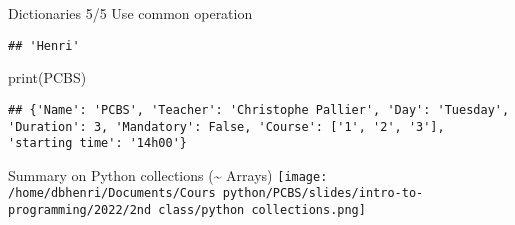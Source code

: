\documentclass[
  8pt,
  ignorenonframetext,
]{beamer}
\newenvironment{Shaded}{\begin{snugshade}}{\end{snugshade}}
\newcommand{\BuiltInTok}[1]{#1}
\newcommand{\NormalTok}[1]{#1}
\begin{document}
\begin{frame}[fragile]{Dictionaries 5/5 Use common operation}
\begin{itemize}[<+->]
\begin{verbatim}
## 'Henri'
\end{verbatim}

\begin{Shaded}
\begin{Highlighting}[]
\BuiltInTok{print}\NormalTok{(PCBS)}
\end{Highlighting}
\end{Shaded}

\begin{verbatim}
## {'Name': 'PCBS', 'Teacher': 'Christophe Pallier', 'Day': 'Tuesday', 'Duration': 3, 'Mandatory': False, 'Course': ['1', '2', '3'], 'starting time': '14h00'}
\end{verbatim}
\end{itemize}
\end{frame}

\begin{frame}{Summary on Python collections (\textasciitilde{} Arrays)}
\protect\hypertarget{summary-on-python-collections-arrays}{}
\texttt{[image: /home/dbhenri/Documents/Cours python/PCBS/slides/intro-to-programming/2022/2nd class/python collections.png]}
\end{frame}
\end{document}
